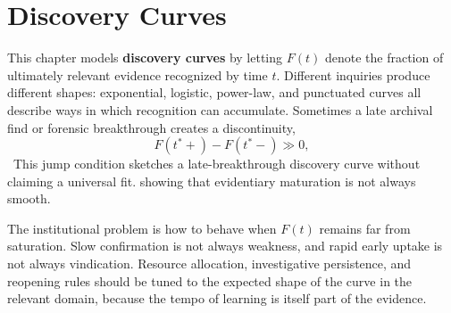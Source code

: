 
\chapter{Discovery Curves}
\label{ch:ch020}

This chapter models \textbf{discovery curves} by letting \(F(t)\) denote the fraction of ultimately relevant evidence recognized by time \(t\). Different inquiries produce different shapes: exponential, logistic, power-law, and punctuated curves all describe ways in which recognition can accumulate. Sometimes a late archival find or forensic breakthrough creates a discontinuity,
\[
F(t^\ast+)-F(t^\ast-)\gg 0,
\]
\ToyModel\ This jump condition sketches a late-breakthrough discovery curve without claiming a universal fit.
showing that evidentiary maturation is not always smooth.

The institutional problem is how to behave when \(F(t)\) remains far from saturation. Slow confirmation is not always weakness, and rapid early uptake is not always vindication. Resource allocation, investigative persistence, and reopening rules should be tuned to the expected shape of the curve in the relevant domain, because the tempo of learning is itself part of the evidence.
